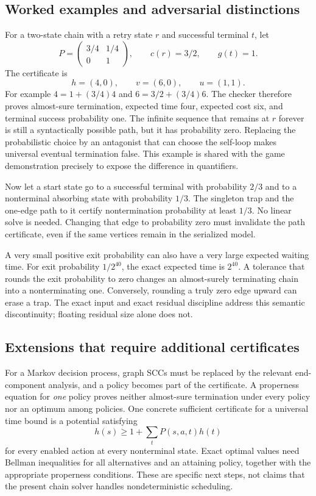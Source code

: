 \subsection{Worked examples and adversarial distinctions}
For a two-state chain with a retry state $r$ and successful terminal $t$, let
\[
 P=\begin{pmatrix}3/4&1/4\\0&1\end{pmatrix},
 \qquad c(r)=3/2,
 \qquad g(t)=1.
\]
The certificate is
\[
 h=(4,0),\qquad v=(6,0),\qquad u=(1,1).
\]
For example $4=1+(3/4)4$ and $6=3/2+(3/4)6$. The checker therefore proves
almost-sure termination, expected time four, expected cost six, and terminal
success probability one. The infinite sequence that remains at $r$ forever is
still a syntactically possible path, but it has probability zero. Replacing
the probabilistic choice by an antagonist that can choose the self-loop makes
universal eventual termination false. This example is shared with the game
demonstration precisely to expose the difference in quantifiers.

Now let a start state go to a successful terminal with probability $2/3$ and
to a nonterminal absorbing state with probability $1/3$. The singleton trap
and the one-edge path to it certify nontermination probability at least
$1/3$. No linear solve is needed. Changing that edge to probability zero must
invalidate the path certificate, even if the same vertices remain in the
serialized model.

A very small positive exit probability can also have a very large expected
waiting time. For exit probability $1/2^{40}$, the exact expected time is
$2^{40}$. A tolerance that rounds the exit probability to zero changes an
almost-surely terminating chain into a nonterminating one. Conversely,
rounding a truly zero edge upward can erase a trap. The exact input and exact
residual discipline address this semantic discontinuity; floating residual
size alone does not.

\subsection{Extensions that require additional certificates}
For a Markov decision process, graph SCCs must be replaced by the relevant
end-component analysis, and a policy becomes part of the certificate. A
properness equation for \emph{one} policy proves neither almost-sure
termination under every policy nor an optimum among policies. One concrete
sufficient certificate for a universal time bound is a potential satisfying
\[
 h(s)\geq1+\sum_tP(s,a,t)h(t)
\]
for every enabled action at every nonterminal state. Exact optimal values need
Bellman inequalities for all alternatives and an attaining policy, together
with the appropriate properness conditions. These are specific next steps,
not claims that the present chain solver handles nondeterministic scheduling.

